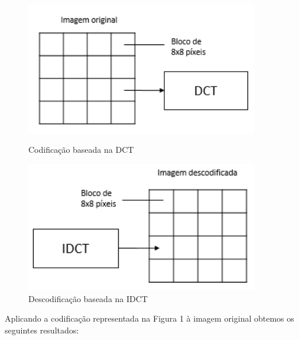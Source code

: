 \documentclass[12pt,a4paper]{article}
\begin{document}
\begin{figure}[h]
	\centering
    \begin{minipage}{0.45\textwidth}
        \centering
        \includegraphics[width=0.9\textwidth]{imagens/dct.png}
        \caption{Codificação baseada na DCT}
    \end{minipage}\hfill
    \begin{minipage}{0.45\textwidth}
        \centering
        \includegraphics[width=0.9\textwidth]{imagens/idct.png}
        \caption{Descodificação baseada na IDCT}
    \end{minipage}
\end{figure}

Aplicando a codificação representada na Figura 1 à imagem original obtemos os seguintes resultados:
\end{document}
